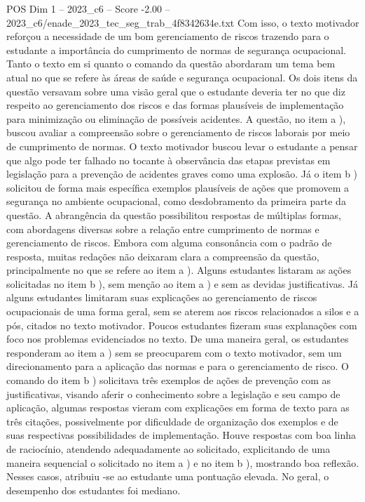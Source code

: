 \begin{textsample}{POS Dim 1 – 2023\_c6 – Score -2.00 – 2023\_c6/enade\_2023\_tec\_seg\_trab\_4f8342634e.txt}
Com isso, o texto motivador reforçou a necessidade de um bom gerenciamento de riscos trazendo para o estudante a importância do cumprimento de normas de segurança ocupacional.
Tanto o texto em si quanto o comando da questão abordaram um tema bem atual no que se refere às áreas de saúde e segurança ocupacional.
Os dois itens da questão versavam sobre uma visão geral que o estudante deveria ter no que diz respeito ao gerenciamento dos riscos e das formas plausíveis de implementação para minimização ou eliminação de possíveis acidentes.
A questão, no item a ), buscou avaliar a compreensão sobre o gerenciamento de riscos laborais por meio de cumprimento de normas.
O texto motivador buscou levar o estudante a pensar que algo pode ter falhado no tocante à observância das etapas previstas em legislação para a prevenção de acidentes graves como uma explosão.
Já o item b ) solicitou de forma mais específica exemplos plausíveis de ações que promovem a segurança no ambiente ocupacional, como desdobramento da primeira parte da questão.
A abrangência da questão possibilitou respostas de múltiplas formas, com abordagens diversas sobre a relação entre cumprimento de normas e gerenciamento de riscos.
Embora com alguma consonância com o padrão de resposta, muitas redações não deixaram clara a compreensão da questão, principalmente no que se refere ao item a ).
Alguns estudantes listaram as ações solicitadas no item b ), sem menção ao item a ) e sem as devidas justificativas.
Já alguns estudantes limitaram suas explicações ao gerenciamento de riscos ocupacionais de uma forma geral, sem se aterem aos riscos relacionados a silos e a pós, citados no texto motivador.
Poucos estudantes fizeram suas explanações com foco nos problemas evidenciados no texto.
De uma maneira geral, os estudantes responderam ao item a ) sem se preocuparem com o texto motivador, sem um direcionamento para a aplicação das normas e para o gerenciamento de risco.
O comando do item b ) solicitava três exemplos de ações de prevenção com as justificativas, visando aferir o conhecimento sobre a legislação e seu campo de aplicação, algumas respostas vieram com explicações em forma de texto para as três citações, possivelmente por dificuldade de organização dos exemplos e de suas respectivas possibilidades de implementação.
Houve respostas com boa linha de raciocínio, atendendo adequadamente ao solicitado, explicitando de uma maneira sequencial o solicitado no item a ) e no item b ), mostrando boa reflexão.
Nesses casos, atribuiu -se ao estudante uma pontuação elevada.
No geral, o desempenho dos estudantes foi mediano.

\end{textsample}
